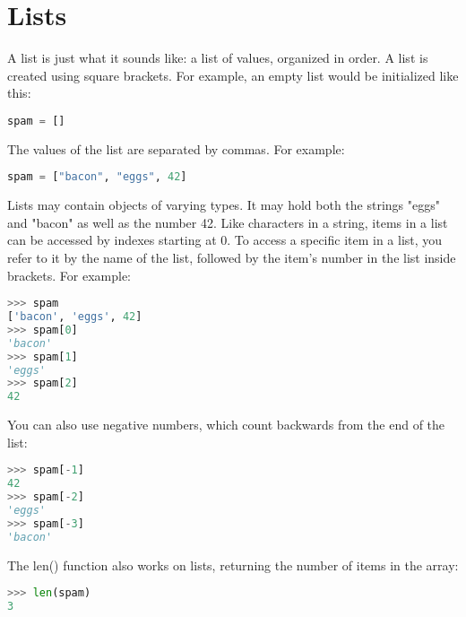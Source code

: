 \section{Lists}
A list is just what it sounds like: a list of values, organized in order. A list
is created using square brackets. For example, an empty list would be
initialized like this:
\lstset{basicstyle=\scriptsize, numbers=left, captionpos=b, tabsize=4}
\begin{lstlisting}[caption=List Definition 1,language={Python},
xleftmargin=15pt, label=lst:listdefinition1]
spam = []
\end{lstlisting}

The values of the list are separated by commas. For example:
\lstset{basicstyle=\scriptsize, numbers=left, captionpos=b, tabsize=4}
\begin{lstlisting}[caption=List Definition 2,language={Python},
xleftmargin=15pt, label=lst:listdefinition2]
spam = ["bacon", "eggs", 42]
\end{lstlisting}

Lists may contain objects of varying types. It may hold both the strings "eggs"
and "bacon" as well as the number 42.  Like characters in a string, items in a
list can be accessed by indexes starting at 0. To access a specific item in a
list, you refer to it by the name of the list, followed by the item's number in
the list inside brackets. For example:
\lstset{basicstyle=\scriptsize, numbers=left, captionpos=b, tabsize=4}
\begin{lstlisting}[caption=List Definition 3,language={Python},
xleftmargin=15pt, label=lst:listdefinition3]
>>> spam
['bacon', 'eggs', 42]
>>> spam[0]
'bacon'
>>> spam[1]
'eggs'
>>> spam[2]
42
\end{lstlisting}

You can also use negative numbers, which count backwards from the end of the list:
\lstset{basicstyle=\scriptsize, numbers=left, captionpos=b, tabsize=4}
\begin{lstlisting}[caption=List negativ Index,language={Python},
xleftmargin=15pt, label=lst:listnegativindex]
>>> spam[-1]
42
>>> spam[-2]
'eggs'
>>> spam[-3]
'bacon'
\end{lstlisting}

The len() function also works on lists, returning the number of items in the array:
\lstset{basicstyle=\scriptsize, numbers=left, captionpos=b, tabsize=4}
\begin{lstlisting}[caption=len Function List,language={Python},
xleftmargin=15pt, label=lst:lenfunctionlist]
>>> len(spam)
3
\end{lstlisting}

